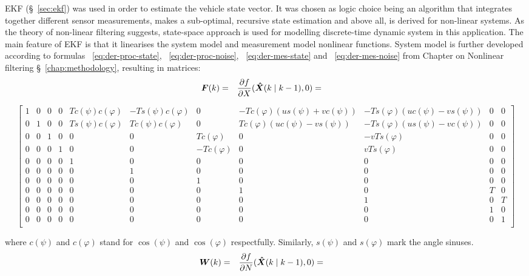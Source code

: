 EKF (\S~\ref{sec:ekf}) was used in order to estimate the vehicle state vector. It was chosen as logic choice being an algorithm that integrates together different sensor measurements, makes a sub-optimal, recursive state estimation and above all, is derived for non-linear systems. As the theory of non-linear filtering suggests, state-space approach is used for modelling discrete-time dynamic system in this application. The main feature of EKF is that it linearises the system model and measurement model nonlinear functions. System model is further developed according to formulas ~\ref{eq:der-proc-state}, ~\ref{eq:der-proc-noise}, ~\ref{eq:der-mes-state} and ~\ref{eq:der-mes-noise} from Chapter on Nonlinear filtering \S~\ref{chap:methodology}, resulting in matrices:
\begin{align*}
\boldsymbol{F}(k) & = &  \frac{\partial f}{\partial X} (\boldsymbol{\hat{X}}(k \mid k-1), 0) & = & 
\end{align*}
\begin{footnotesize}
$$ \left[ 
\begin{array}{ccccccccccc}
1 & 0 & 0 & 0 & T c(\psi) c(\varphi) & -T s(\psi) c(\varphi) & 0 & -Tc(\varphi)(us(\psi)+vc(\psi)) & -Ts(\varphi)(uc(\psi)-vs(\psi)) & 0 & 0 \\
0 & 1 & 0 & 0 & T s(\psi) c(\varphi) & T c(\psi) c(\varphi) & 0 & Tc(\varphi)(uc(\psi)-vs(\psi)) & -Ts(\varphi)(us(\psi)-vc(\psi))  & 0 & 0 \\
0 & 0 & 1 & 0 & 0 & 0 &  Tc(\varphi) & 0 & -vTs(\varphi) & 0 & 0 \\
0 & 0 & 0 & 1 & 0 & 0 & -Tc(\varphi) & 0 &  vTs(\varphi) & 0 & 0 \\
0 & 0 & 0 & 0 & 1 & 0 & 0 & 0 & 0 & 0 & 0 \\
0 & 0 & 0 & 0 & 0 & 1 & 0 & 0 & 0 & 0 & 0 \\
0 & 0 & 0 & 0 & 0 & 0 & 1 & 0 & 0 & 0 & 0 \\
0 & 0 & 0 & 0 & 0 & 0 & 0 & 1 & 0 & T & 0 \\
0 & 0 & 0 & 0 & 0 & 0 & 0 & 0 & 1 & 0 & T \\
0 & 0 & 0 & 0 & 0 & 0 & 0 & 0 & 0 & 1 & 0 \\
0 & 0 & 0 & 0 & 0 & 0 & 0 & 0 & 0 & 0 & 1 \\
\end{array}
\right] $$ 
\end{footnotesize}
where $c(\psi)$ and $c(\varphi)$ stand for $\cos(\psi)$ and $\cos(\varphi)$ respectfully. Similarly, $s(\psi)$ and $s(\varphi)$ mark the angle sinuses.  
\begin{align*}
\boldsymbol{W}(k) & = & \frac{\partial f}{\partial N} (\boldsymbol{\hat{X}}(k \mid k-1), 0) & = &
\end{align*}
